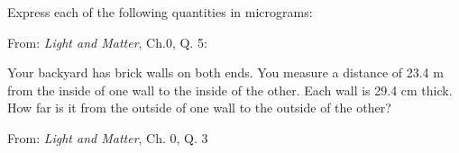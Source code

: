 \documentclass[addpoints,12pt]{exam}
\begin{document}
\begin{questions}
\question[5]
Express each of the following quantities in micrograms:

From: \textit{Light and Matter}, Ch.0, Q. 5:

\question[3]
Your backyard has brick walls on both ends. You measure a distance of 23.4 m from the inside of one wall to the inside of the other. Each wall is 29.4 cm thick. How far is it from the outside
of one wall to the outside of the other?

From: \textit{Light and Matter}, Ch. 0, Q. 3
\vspace{3in}



\end{questions}
\end{document}
